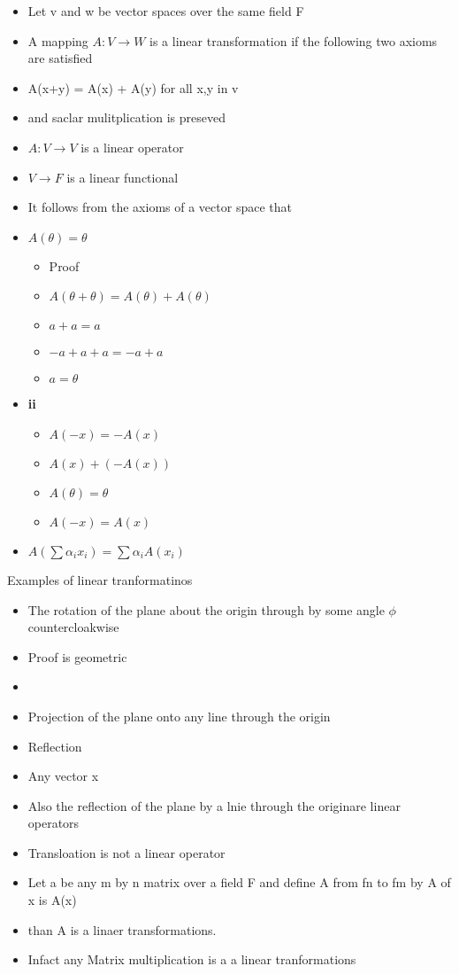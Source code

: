 \documentclass[twocolumn]{article}
\providecommand{\tightlist}{%
  \setlength{\itemsep}{0pt}\setlength{\parskip}{0pt}}
\begin{document}
\begin{itemize}
\tightlist
\item
  Let v and w be vector spaces over the same field F
\item
  A mapping \(A:V \to W\) is a linear transformation if the following
  two axioms are satisfied
\item
  A(x+y) = A(x) + A(y) for all x,y in v
\item
  and saclar mulitplication is preseved
\item
  \(A: V \to V\) is a linear operator
\item
  \(V \to F\) is a linear functional
\item
  It follows from the axioms of a vector space that
\item
  \(A(\theta) = \theta\)

  \begin{itemize}
  \tightlist
  \item
    Proof
  \item
    \(A(\theta + \theta) = A(\theta) + A(\theta)\)
  \item
    \(a + a = a\)
  \item
    \(-a + a + a = -a + a\)
  \item
    \(a = \theta\)
  \end{itemize}
\item
  \textbf{ii}

  \begin{itemize}
  \tightlist
  \item
    \(A(-x) = -A(x)\)
  \item
    \(A(x) +(-A(x))\)
  \item
    \(A(\theta) = \theta\)
  \item
    \(A(-x)= A(x)\)
  \end{itemize}
\item
  \(A(\sum \alpha_i x_i) = \sum \alpha_i A(x_i)\)
\end{itemize}

Examples of linear tranformatinos

\begin{itemize}
\item
  The rotation of the plane about the origin through by some angle
  \(\phi\) countercloakwise
\item
  Proof is geometric
\item
\item
  Projection of the plane onto any line through the origin
\item
  Reflection
\item
  Any vector x
\item
  Also the reflection of the plane by a lnie through the originare
  linear operators
\item
  Transloation is not a linear operator
\item
  Let a be any m by n matrix over a field F and define A from fn to fm
  by A of x is A(x)
\item
  than A is a linaer transformations.
\item
  Infact any Matrix multiplication is a a linear tranformations
\end{itemize}
\end{document}
